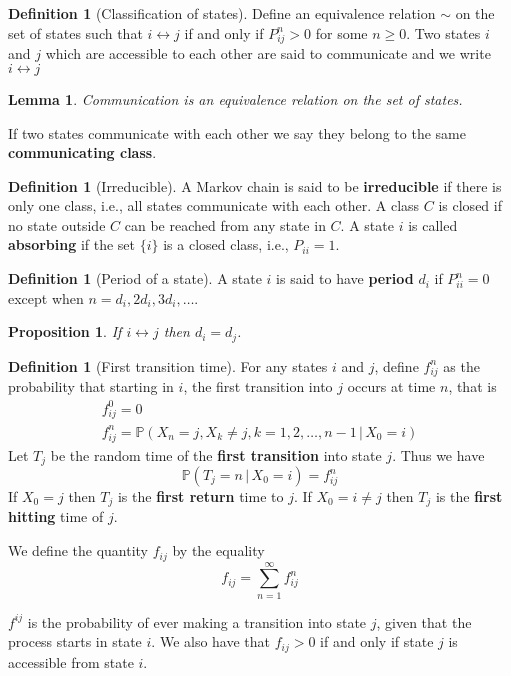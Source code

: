 \documentclass[10pt, oneside, reqno]{amsart}
\theoremstyle{plain}%
\newtheorem{lem}[thm]{Lemma}
\newtheorem{prop}[thm]{Proposition}
\theoremstyle{definition}
\newtheorem{defn}[thm]{Definition}
\theoremstyle{remark}
\newcommand{\prob}[1]{\mathbb{P}(#1)}
\newcommand{\given}{ \, | \,}
\begin{document}
\begin{defn}[Classification of states]
	Define an equivalence relation $\sim$ on the set of states such that $i \leftrightarrow j$ if and only if $P^n_{ij} > 0$ for some $n \geq 0$.  Two states $i$ and $j$ which are accessible to each other are said to communicate and we write $i \leftrightarrow j$
\end{defn}

\begin{lem}
	Communication is an equivalence relation on the set of states.
\end{lem}

If two states communicate with each other we say they belong to the same \textbf{communicating class}.  

\begin{defn}[Irreducible]
	A Markov chain is said to be \textbf{irreducible} if there is only one class, i.e., all states communicate with each other.  A class $C$ is closed if no state outside $C$ can be reached from any state in $C$.  A state $i$ is called \textbf{absorbing} if the set $\{i \}$ is a closed class, i.e., $P_{ii} = 1$.
\end{defn}

\begin{defn}[Period of a state]
	A state $i$ is said to have \textbf{period} $d_i$ if $P^{n}_{ii} = 0$ except when $n = d_i, 2d_i, 3d_i, \dots$.
\end{defn}

\begin{prop}
	If $i \leftrightarrow j$ then $d_i = d_j$.  
\end{prop}

\begin{defn}[First transition time]
	For any states $i$ and $j$, define $f^n_{ij}$ as the probability that starting in $i$, the first transition into $j$ occurs at time $n$, that is \begin{align*}
		f^0_{ij} = 0 \\
		f^n_{ij} = \prob{X_n = j, X_k \neq j, k = 1,2,\dots, n-1 \, | \, X_0 = i}
	\end{align*}
Let $T_j$ be the random time of the \textbf{first transition} into state $j$.  Thus we have \[
	\prob{T_j = n \given X_0 = i} = f^n_{ij}
\]
If $X_0 = j$ then $T_j$ is the \textbf{first return} time to $j$.  If $X_0 = i \neq j$ then $T_j$ is the \textbf{first hitting} time of $j$.

We define the quantity $f_{ij}$ by the equality \[
	f_{ij} = \sum_{n=1}^\infty f^n_{ij}
\]

$f^{ij}$ is the probability of ever making a transition into state $j$, given that the process starts in state $i$.  We also have that $f_{ij} > 0$ if and only if state $j$ is accessible from state $i$.
\end{defn}
\end{document}
